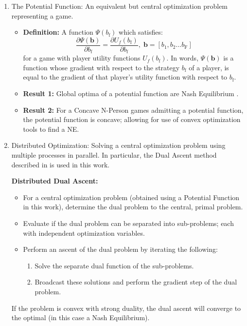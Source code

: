 \documentclass[12pt,a4paper]{report}
\begin{document}
\begin{enumerate}
\begin{itemize}
\end{itemize}
\item The Potential Function: An equivalent but central optimization problem representing a game.
\begin{itemize}
\item
\textbf{Definition:}  A function
$ \Psi(b_{\text{f}})$ which satisfies:
\begin{equation}\label{potential_game_condition}
\frac{\partial \Psi(\mathbf{b})}{\partial b_{\text{f}}}
 =
 \frac{\partial U_f(b_{\text{f}})}{\partial b_{\text{f}}},
 \;\textbf{b}=[b_{1}, b_2... b_{\text{F}}]
\end{equation} 
for a game with player utility functions $U_f(b_{\text{f}})$.
In words, $ \Psi(\mathbf{b})$ is a function whose gradient with respect to the strategy $b_{\text{f}}$ of a player, is equal to the gradient of that player's utility function with respect to $b_{\text{f}}$.
\item \textbf{Result 1:} Global optima of a potential function are Nash Equilibrium \cite{monderer1996potential}.
\item \textbf{Result 2:} For a Concave N-Person games admitting a potential function, the potential function is concave; allowing for use of convex optimization tools to find a NE. 
\end{itemize}



\item Distributed Optimization: Solving a central optimization problem using multiple processes in parallel.
In particular, the Dual Ascent method described in \cite{boyd2011distributed} is used in this work.

\textbf{Distributed Dual Ascent:} 
\begin{itemize}
\item For a central optimization problem (obtained using a Potential Function in this work), determine the dual problem to the central, primal problem.
\item Evaluate if the dual problem can be separated into sub-problems; each with independent optimization variables.
\item Perform an ascent of the dual problem by iterating the following:
\begin{enumerate}
\item Solve the separate dual function of the sub-problems.
\item Broadcast these solutions and perform the gradient step of the dual problem.
\end{enumerate}
\end{itemize}

If the problem is convex with strong duality, the dual ascent will converge to the optimal (in this case a Nash Equilibrium).

\end{enumerate}
\end{document}
